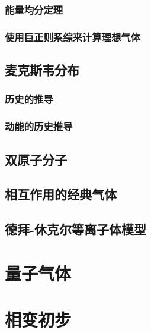 \documentclass[11pt]{ctexart}
\begin{document}
\subsubsection{能量均分定理}

\subsubsection{使用巨正则系综来计算理想气体}
\subsection{麦克斯韦分布}
\subsubsection{历史的推导}
\subsubsection{动能的历史推导}
\subsection{双原子分子}
\subsection{相互作用的经典气体}
\subsection{德拜-休克尔等离子体模型}
\section{量子气体}
\section{相变初步}
\end{document}
